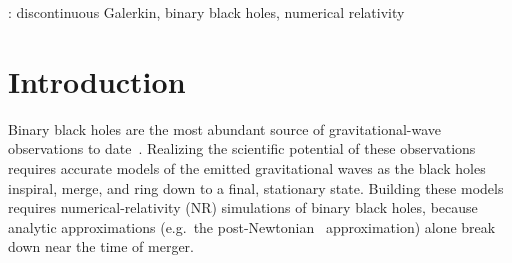 \begin{bibunit}[unsrtnat]

\begin{abstract}

  Binary black holes are the most abundant source of gravitational-wave
  observations. Gravitational-wave observatories in the next decade will require
  tremendous increases in the accuracy of numerical waveforms modeling binary
  black holes, compared to today's state of the art. One approach to achieving
  the required accuracy is using spectral-type methods that scale to many
  processors. Using the
  \texttt{SpECTRE} numerical-relativity code, we present the first simulations
  of a binary black hole inspiral, merger, and ringdown using discontinuous
  Galerkin methods. The efficiency of discontinuous Galerkin methods allows us
  to evolve the binary through $\sim18$ orbits at reasonable computational cost.
  We then use \texttt{SpECTRE}'s Cauchy Characteristic Evolution (CCE) code to
  extract the gravitational waves at future null infinity.  The open-source
  nature of \texttt{SpECTRE} means this is the first time a spectral-type method
  for simulating binary black hole evolutions is available to the entire
  numerical-relativity community.

\end{abstract}

: discontinuous Galerkin, binary black holes, numerical
relativity


\section{Introduction\label{sec:introduction}}

Binary black holes are the most abundant source of gravitational-wave
observations to date~\cite{KAGRA:2021vkt}. Realizing the scientific potential of
these observations requires accurate models of the emitted gravitational waves
as the black holes inspiral, merge, and ring down to a final, stationary
state. Building these models requires numerical-relativity (NR) simulations of binary
black holes, because analytic approximations (e.g.~the
post-Newtonian~\cite{Blanchet:2024mnz} approximation) alone break down near the
time of merger.


\end{bibunit}
